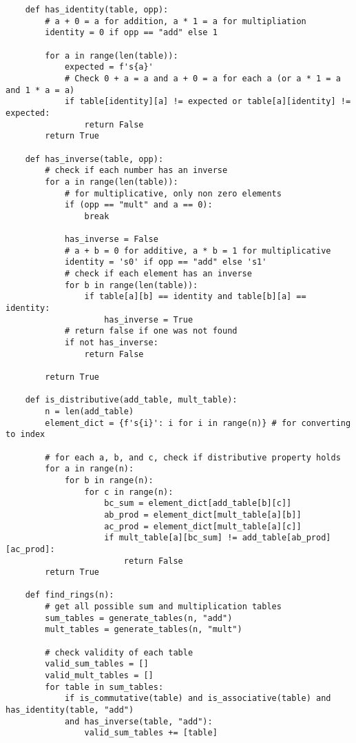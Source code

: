 \documentclass{article}
\begin{document}
\begin{verbatim}
    def has_identity(table, opp):
        # a + 0 = a for addition, a * 1 = a for multipliation
        identity = 0 if opp == "add" else 1
        
        for a in range(len(table)):
            expected = f's{a}'
            # Check 0 + a = a and a + 0 = a for each a (or a * 1 = a and 1 * a = a)
            if table[identity][a] != expected or table[a][identity] != expected: 
                return False
        return True
    
    def has_inverse(table, opp):
        # check if each number has an inverse
        for a in range(len(table)):
            # for multiplicative, only non zero elements 
            if (opp == "mult" and a == 0):
                break
    
            has_inverse = False
            # a + b = 0 for additive, a * b = 1 for multiplicative
            identity = 's0' if opp == "add" else 's1'
            # check if each element has an inverse
            for b in range(len(table)):
                if table[a][b] == identity and table[b][a] == identity:
                    has_inverse = True
            # return false if one was not found
            if not has_inverse:
                return False
            
        return True
    
    def is_distributive(add_table, mult_table):
        n = len(add_table)
        element_dict = {f's{i}': i for i in range(n)} # for converting to index
    
        # for each a, b, and c, check if distributive property holds
        for a in range(n):
            for b in range(n):
                for c in range(n):
                    bc_sum = element_dict[add_table[b][c]]
                    ab_prod = element_dict[mult_table[a][b]]
                    ac_prod = element_dict[mult_table[a][c]]
                    if mult_table[a][bc_sum] != add_table[ab_prod][ac_prod]:
                        return False
        return True
    
    def find_rings(n):
        # get all possible sum and multiplication tables
        sum_tables = generate_tables(n, "add")
        mult_tables = generate_tables(n, "mult")
        
        # check validity of each table 
        valid_sum_tables = []
        valid_mult_tables = []
        for table in sum_tables:
            if is_commutative(table) and is_associative(table) and has_identity(table, "add")
            and has_inverse(table, "add"):
                valid_sum_tables += [table]
    

\end{verbatim}
\end{document}
